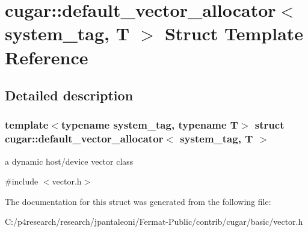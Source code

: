 \hypertarget{structcugar_1_1default__vector__allocator}{}\section{cugar\+:\+:default\+\_\+vector\+\_\+allocator$<$ system\+\_\+tag, T $>$ Struct Template Reference}
\label{structcugar_1_1default__vector__allocator}


\subsection{Detailed description}
\subsubsection*{template$<$typename system\+\_\+tag, typename T$>$\newline
struct cugar\+::default\+\_\+vector\+\_\+allocator$<$ system\+\_\+tag, T $>$}

a dynamic host/device vector class 

{\ttfamily \#include $<$vector.\+h$>$}



The documentation for this struct was generated from the following file\+:\begin{DoxyCompactItemize}
\item 
C\+:/p4research/research/jpantaleoni/\+Fermat-\/\+Public/contrib/cugar/basic/vector.\+h\end{DoxyCompactItemize}
